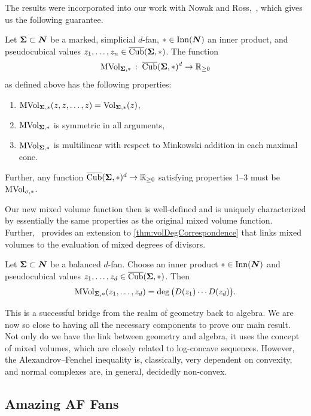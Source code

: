 \documentclass[12pt,oneside]{../../sfsuthesis}
\begin{document}
The results were incorporated into our work with Nowak and Ross,~\cite[Proposition~3.1]{nowakMixedVolumesNormal2023}, which gives us the following guarantee.
\begin{proposition}
    Let \( {\bm{\Sigma}} \subset \bm{N} \) be a marked, simplicial \( d \)-fan, \( \ast \in \operatorname{Inn}(\bm{N}) \) an inner product, and pseudocubical values \( z_1, \dots, z_n \in \operatorname{\overline{Cub}}({\bm{\Sigma}}, \ast)\).
    The function
    \[
        \operatorname{MVol}_{{\bm{\Sigma}}, \ast}\,:\; \operatorname{\overline{Cub}}({\bm{\Sigma}}, \ast)^d \to \mathbb{R}_{\geq 0}
    \]
    as defined above has the following properties:
    \begin{enumerate}
        \item \( \operatorname{MVol}_{{\bm{\Sigma}}, \ast}(z, z, \dots, z) = \operatorname{Vol}_{{\bm{\Sigma}}, \ast}(z) \),
        \item \( \operatorname{MVol}_{{\bm{\Sigma}}, \ast} \) is symmetric in all arguments,
        \item \( \operatorname{MVol}_{{\bm{\Sigma}}, \ast} \) is multilinear with respect to Minkowski addition in each maximal cone.
    \end{enumerate}

    Further, any function \( \operatorname{\overline{Cub}}({\bm{\Sigma}}, \ast)^d \to \mathbb{R}_{\geq 0} \) satisfying properties 1--3 must be \( \operatorname{MVol}_{\sigma, \ast} \).
\end{proposition}
Our new mixed volume function then is well-defined and is uniquely characterized by essentially the same properties as the original mixed volume function.
Further,~\cite[Theorem~3.6]{nowakMixedVolumesNormal2023} provides an extension to \th\ref{thm:volDegCorrespondence} that links mixed volumes to the evaluation of mixed degrees of divisors.
\begin{theorem}\th\label{thm:mixedDeg}
    Let \( {\bm{\Sigma}} \subset \bm{N} \) be a balanced \( d \)-fan.
    Choose an inner product \( \ast \in \operatorname{Inn}(\bm{N}) \) and pseudocubical values \( z_1, \dots, z_d \in \operatorname{\overline{Cub}}( {\bm{\Sigma}}, \ast ) \).
    Then
    \[
        \operatorname{MVol}_{{\bm{\Sigma}}, \ast}(z_1, \dots, z_d) = \deg\big( D(z_1) \cdots D(z_d) \big).
    \]
\end{theorem}
This is a successful bridge from the realm of geometry back to algebra.
We are now so close to having all the necessary components to prove our main result.
Not only do we have the link between geometry and algebra, it uses the concept of mixed volumes, which are closely related to log-concave sequences.
However, the Alexandrov--Fenchel inequality is, classically, very dependent on convexity, and normal complexes are, in general, decidedly non-convex.

\subsection{Amazing AF Fans}
\end{document}
